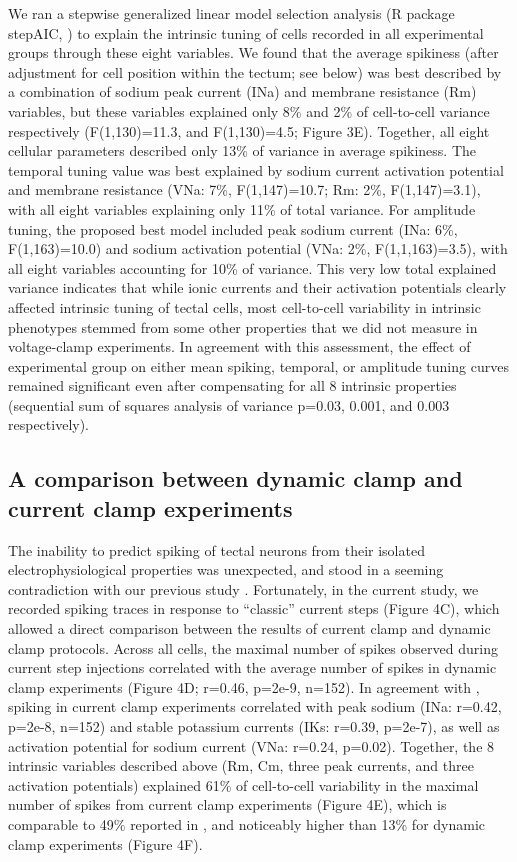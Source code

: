 \documentclass{article}
\begin{document}
We ran a stepwise generalized linear model selection analysis (R package stepAIC, \citealt{venables2013}) to explain the intrinsic tuning of cells recorded in all experimental groups through these eight variables. We found that the average spikiness (after adjustment for cell position within the tectum; see below) was best described by a combination of sodium peak current (INa) and membrane resistance (Rm) variables, but these variables explained only 8\% and 2\% of cell-to-cell variance respectively (F(1,130)=11.3, and F(1,130)=4.5; Figure 3E). Together, all eight cellular parameters described only 13\% of variance in average spikiness. The temporal tuning value was best explained by sodium current activation potential and membrane resistance (VNa: 7\%, F(1,147)=10.7; Rm: 2\%, F(1,147)=3.1), with all eight variables explaining only 11\% of total variance. For amplitude tuning, the proposed best model included peak sodium current (INa: 6\%, F(1,163)=10.0) and sodium activation potential (VNa: 2\%, F(1,1,163)=3.5), with all eight variables accounting for 10\% of variance. This very low total explained variance indicates that while ionic currents and their activation potentials clearly affected intrinsic tuning of tectal cells, most cell-to-cell variability in intrinsic phenotypes stemmed from some other properties that we did not measure in voltage-clamp experiments. In agreement with this assessment, the effect of experimental group on either mean spiking, temporal, or amplitude tuning curves remained significant even after compensating for all 8 intrinsic properties (sequential sum of squares analysis of variance p=0.03, 0.001, and 0.003 respectively).

\subsection*{A comparison between dynamic clamp and current clamp experiments}

The inability to predict spiking of tectal neurons from their isolated electrophysiological properties was unexpected, and stood in a seeming contradiction with our previous study \citep{ciarleglio2015}. Fortunately, in the current study, we recorded spiking traces in response to “classic” current steps (Figure 4C), which allowed a direct comparison between the results of current clamp and dynamic clamp protocols. Across all cells, the maximal number of spikes observed during current step injections correlated with the average number of spikes in dynamic clamp experiments (Figure 4D; r=0.46, p=2e-9, n=152). In agreement with \citep{ciarleglio2015}, spiking in current clamp experiments correlated with peak sodium (INa: r=0.42, p=2e-8, n=152) and stable potassium currents (IKs: r=0.39, p=2e-7), as well as activation potential for sodium current (VNa: r=0.24, p=0.02). Together, the 8 intrinsic variables described above (Rm, Cm, three peak currents, and three activation potentials) explained 61\% of cell-to-cell variability in the maximal number of spikes from current clamp experiments (Figure 4E), which is comparable to 49\% reported in \citep{ciarleglio2015}, and noticeably higher than 13\% for dynamic clamp experiments (Figure 4F).
\end{document}
